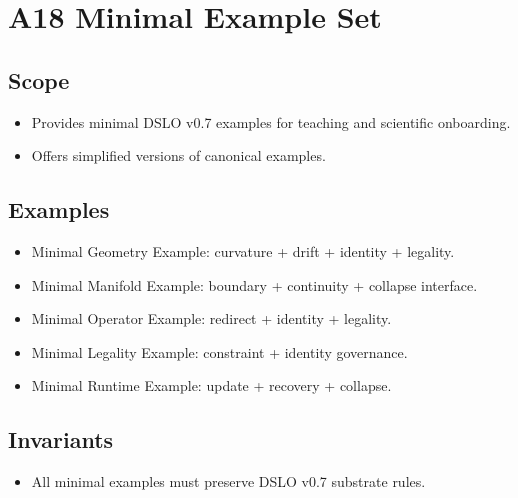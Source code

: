 \section{A18 Minimal Example Set}

\subsection{Scope}
\begin{itemize}
    \item Provides minimal DSLO v0.7 examples for teaching and scientific onboarding.
    \item Offers simplified versions of canonical examples.
\end{itemize}

\subsection{Examples}
\begin{itemize}
    \item Minimal Geometry Example: curvature + drift + identity + legality.
    \item Minimal Manifold Example: boundary + continuity + collapse interface.
    \item Minimal Operator Example: redirect + identity + legality.
    \item Minimal Legality Example: constraint + identity governance.
    \item Minimal Runtime Example: update + recovery + collapse.
\end{itemize}

\subsection{Invariants}
\begin{itemize}
    \item All minimal examples must preserve DSLO v0.7 substrate rules.
\end{itemize}
